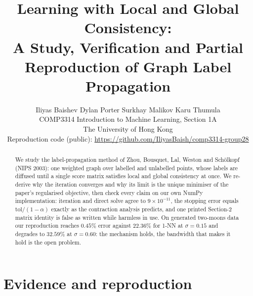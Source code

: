 \documentclass{article}
\title{Learning with Local and Global Consistency:\\
A Study, Verification and Partial Reproduction of Graph Label Propagation}
\author{
Iliyas Baishev \quad Dylan Porter \quad Surkhay Malikov \quad Karu Thumula\\
COMP3314 Introduction to Machine Learning, Section 1A\\
The University of Hong Kong\\
Reproduction code (public): \url{https://github.com/IliyasBaish/comp3314-group28}
}
\begin{document}
\maketitle

\begin{abstract}
We study the label-propagation method of Zhou, Bousquet, Lal, Weston and
Schölkopf (NIPS 2003): one weighted graph over labelled and unlabelled points,
whose labels are diffused until a single score matrix satisfies local and global
consistency at once. We re-derive why the iteration converges and why its limit
is the unique minimiser of the paper's regularised objective, then check every
claim on our own NumPy implementation: iteration and direct solve agree to
$9\times10^{-11}$, the stopping error equals $\mathrm{tol}/(1-\alpha)$ exactly as
the contraction analysis predicts, and one printed Section-2 matrix identity is
false as written while harmless in use. On generated two-moons data our reproduction
reaches $0.45\%$ error against $22.36\%$ for 1-NN at $\sigma=0.15$ and degrades
to $32.59\%$ at $\sigma=0.60$: the mechanism holds, the bandwidth that makes it
hold is the open problem.
\end{abstract}

\section{Evidence and reproduction}\label{sec:evidence}




\appendix
\end{document}

